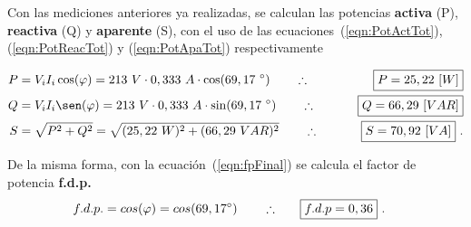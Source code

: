     Con las mediciones anteriores ya realizadas, se calculan las potencias \textbf{activa} (P), \textbf{reactiva} (Q)
    y \textbf{aparente} (S), con el uso de las ecuaciones~(\ref{eqn:PotActTot}), (\ref{eqn:PotReacTot}) y 
    (\ref{eqn:PotApaTot}) respectivamente

    \begin{align*}
      P &= V_i  I_i  \cos(\varphi) = 213\ V \cdot 0,333\ A \cdot \cos(69,17\ ^{\circ}) 
                                \hspace{20pt} \therefore \hspace{20pt} \Aboxed{P = 25,22\ [W]} \\
      Q &= V_i  I_i  \sen(\varphi) = 213\ V \cdot 0,333\ A \cdot \sin(69,17\ ^{\circ}) 
                                \hspace{20pt} \therefore \hspace{20pt} \Aboxed{Q = 66,29\ [VAR]} \\
      S &= \sqrt{P^2 + Q^2} =  \sqrt{(25,22\ W)^2 + (66,29\ VAR)^2}
                                \hspace{20pt} \therefore \hspace{20pt} \Aboxed{S = 70,92\ [VA]} \ .
    \end{align*}

    \noindent De la misma forma, con la ecuación~(\ref{eqn:fpFinal}) se calcula el factor de potencia \textbf{f.d.p.}
    \begin{align*}
      f.d.p. = cos(\varphi) = cos(69,17 ^{\circ}) \hspace{20pt} \therefore \hspace{20pt} \Aboxed{f.d.p = 0,36}\ .
    \end{align*}



